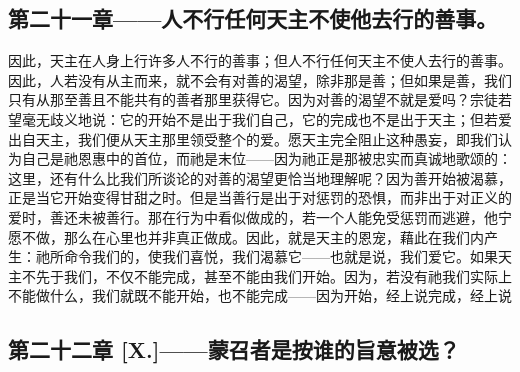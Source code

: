 
\subsection{第二十一章——人不行任何天主不使他去行的善事。}

因此，天主在人身上行许多人不行的善事；但人不行任何天主不使人去行的善事。因此，人若没有从主而来，就不会有对善的渴望，除非那是善；但如果是善，我们只有从那至善且不能共有的善者那里获得它。因为对善的渴望不就是爱吗？宗徒若望毫无歧义地说：它的开始不是出于我们自己，它的完成也不是出于天主；但若爱出自天主，我们便从天主那里领受整个的爱。愿天主完全阻止这种愚妄，即我们认为自己是祂恩惠中的首位，而祂是末位——因为祂正是那被忠实而真诚地歌颂的：这里，还有什么比我们所谈论的对善的渴望更恰当地理解呢？因为善开始被渴慕，正是当它开始变得甘甜之时。但是当善行是出于对惩罚的恐惧，而非出于对正义的爱时，善还未被善行。那在行为中看似做成的，若一个人能免受惩罚而逃避，他宁愿不做，那么在心里也并非真正做成。因此，就是天主的恩宠，藉此在我们内产生：祂所命令我们的，使我们喜悦，我们渴慕它——也就是说，我们爱它。如果天主不先于我们，不仅不能完成，甚至不能由我们开始。因为，若没有祂我们实际上不能做什么，我们就既不能开始，也不能完成——因为开始，经上说完成，经上说\par


\subsection{第二十二章 [X.]——蒙召者是按谁的旨意被选？}

